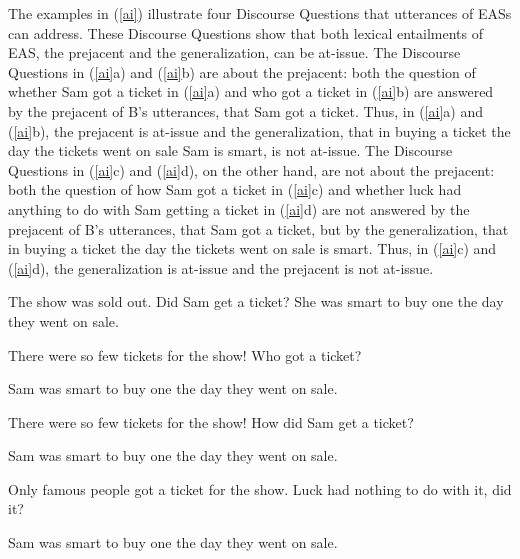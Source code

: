 \documentclass[11pt,fleqn]{article}
\newcommand{\6}{\mbox{$[\hspace*{-.6mm}[$}}
\newcommand{\9}{\mbox{$]\hspace*{-.6mm}]$}}
\begin{document}
The examples in (\ref{ai}) illustrate four Discourse Questions that utterances of EASs can address. These Discourse Questions show that both lexical entailments of EAS, the prejacent and the generalization, can be at-issue. The Discourse Questions in (\ref{ai}a) and (\ref{ai}b) are about the prejacent: both the question of whether Sam got a ticket in (\ref{ai}a) and who got a ticket in (\ref{ai}b) are answered by the prejacent of B's utterances, that Sam got a ticket. Thus, in (\ref{ai}a) and (\ref{ai}b), the prejacent is at-issue and the generalization, that in buying a ticket the day the tickets went on sale Sam is smart, is not at-issue. The Discourse Questions in (\ref{ai}c) and (\ref{ai}d), on the other hand, are not about the prejacent:  both the question of how Sam got a ticket in (\ref{ai}c) and whether luck had anything to do with Sam getting a ticket in (\ref{ai}d) are not answered by the prejacent of B's utterances, that Sam got a ticket, but by the generalization, that in buying a ticket the day the tickets went on sale is smart. Thus, in (\ref{ai}c) and (\ref{ai}d), the generalization is at-issue and the prejacent is not at-issue.

\begin{exe}
\ex\label{ai}

\begin{xlist}
\ex
\begin{xlist}
 The show was sold out. Did Sam get a ticket?
 She was smart to buy one the day they went on sale.
\end{xlist}

\ex
\begin{xlist}
 There were so few tickets for the show! Who got a ticket?

 Sam was smart to buy one the day they went on sale. 

\end{xlist}

\ex
\begin{xlist}
 There were so few tickets for the show! How did Sam get a ticket?

 Sam was smart to buy one the day they went on sale.

\end{xlist}

\ex
\begin{xlist}
 Only famous people got a ticket for the show. Luck had nothing to do with it, did it?

 Sam was smart to buy one the day they went on sale.

\end{xlist}

\end{xlist}
\end{exe}
\end{document}
